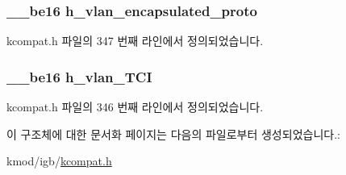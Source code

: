 \subsubsection[{\texorpdfstring{h\+\_\+vlan\+\_\+encapsulated\+\_\+proto}{h_vlan_encapsulated_proto}}]{\setlength{\rightskip}{0pt plus 5cm}\+\_\+\+\_\+be16 h\+\_\+vlan\+\_\+encapsulated\+\_\+proto}\hypertarget{struct__kc__vlan__hdr_a36530e176eb1042729f476437cde0790}{}\label{struct__kc__vlan__hdr_a36530e176eb1042729f476437cde0790}


kcompat.\+h 파일의 347 번째 라인에서 정의되었습니다.

\subsubsection[{\texorpdfstring{h\+\_\+vlan\+\_\+\+T\+CI}{h_vlan_TCI}}]{\setlength{\rightskip}{0pt plus 5cm}\+\_\+\+\_\+be16 h\+\_\+vlan\+\_\+\+T\+CI}\hypertarget{struct__kc__vlan__hdr_aa70cf4362df675d9268e3dd238060f29}{}\label{struct__kc__vlan__hdr_aa70cf4362df675d9268e3dd238060f29}


kcompat.\+h 파일의 346 번째 라인에서 정의되었습니다.



이 구조체에 대한 문서화 페이지는 다음의 파일로부터 생성되었습니다.\+:\begin{DoxyCompactItemize}
\item 
kmod/igb/\hyperlink{kcompat_8h}{kcompat.\+h}\end{DoxyCompactItemize}
